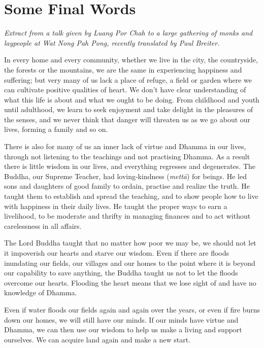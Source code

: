
\chapter{Some Final Words}

\emph{Extract from a talk given by Luang Por Chah to a large gathering
of monks and laypeople at Wat Nong Pah Pong, recently translated by Paul
Breiter.}

In every home and every community, whether we live in the city, the
countryside, the forests or the mountains, we are the same in
experiencing happiness and suffering; but very many of us lack a place
of refuge, a field or garden where we can cultivate positive qualities
of heart. We don't have clear understanding of what this life is about
and what we ought to be doing. From childhood and youth until adulthood, 
we learn to seek enjoyment and take delight in the pleasures of the
senses, and we never think that danger will threaten us as we go about
our lives, forming a family and so on. 

There is also for many of us an inner lack of virtue and Dhamma in our
lives, through not listening to the teachings and not practising Dhamma. 
As a result there is little wisdom in our lives, and everything
regresses and degenerates. The Buddha, our Supreme Teacher, had
loving-kindness (\emph{mettā}) for beings. He led sons and daughters of
good family to ordain, practise and realize the truth. He taught them to
establish and spread the teaching, and to show people how to live with
happiness in their daily lives. He taught the proper ways to earn a
livelihood, to be moderate and thrifty in managing finances and to act
without carelessness in all affairs. 

The Lord Buddha taught that no matter how poor we may be, we should not
let it impoverish our hearts and starve our wisdom. Even if there are
floods inundating our fields, our villages and our homes to the point
where it is beyond our capability to save anything, the Buddha taught us
not to let the floods overcome our hearts. Flooding the heart means that
we lose sight of and have no knowledge of Dhamma. 

Even if water floods our fields again and again over the years, or even
if fire burns down our homes, we will still have our minds. If our minds
have virtue and Dhamma, we can then use our wisdom to help us make a
living and support ourselves. We can acquire land again and make a new
start. 

